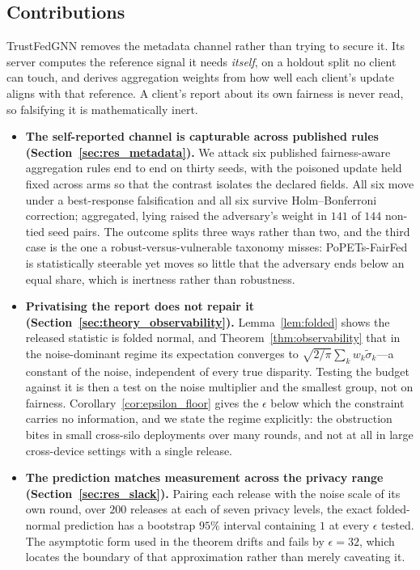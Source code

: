 \documentclass[preprint,12pt]{elsarticle}
\theoremstyle{plain}
\theoremstyle{definition}
\theoremstyle{remark}
\begin{document}
\subsection{Contributions}

TrustFedGNN removes the metadata channel rather than trying to secure it. Its server computes the reference signal it needs \emph{itself}, on a holdout split no client can touch, and derives aggregation weights from how well each client's update aligns with that reference. A client's report about its own fairness is never read, so falsifying it is mathematically inert.

\begin{itemize}
\item \textbf{The self-reported channel is capturable across published rules (Section~\ref{sec:res_metadata}).} We attack six published fairness-aware aggregation rules end to end on thirty seeds, with the poisoned update held fixed across arms so that the contrast isolates the declared fields. All six move under a best-response falsification and all six survive Holm--Bonferroni correction; aggregated, lying raised the adversary's weight in $141$ of $144$ non-tied seed pairs. The outcome splits three ways rather than two, and the third case is the one a robust-versus-vulnerable taxonomy misses: PoPETs-FairFed is statistically steerable yet moves so little that the adversary ends below an equal share, which is inertness rather than robustness.

\item \textbf{Privatising the report does not repair it (Section~\ref{sec:theory_observability}).} Lemma~\ref{lem:folded} shows the released statistic is folded normal, and Theorem~\ref{thm:observability} that in the noise-dominant regime its expectation converges to $\sqrt{2/\pi}\sum_k w_k\tilde\sigma_k$---a constant of the noise, independent of every true disparity. Testing the budget against it is then a test on the noise multiplier and the smallest group, not on fairness. Corollary~\ref{cor:epsilon_floor} gives the $\epsilon$ below which the constraint carries no information, and we state the regime explicitly: the obstruction bites in small cross-silo deployments over many rounds, and not at all in large cross-device settings with a single release.

\item \textbf{The prediction matches measurement across the privacy range (Section~\ref{sec:res_slack}).} Pairing each release with the noise scale of its own round, over $200$ releases at each of seven privacy levels, the exact folded-normal prediction has a bootstrap $95\%$ interval containing $1$ at every $\epsilon$ tested. The asymptotic form used in the theorem drifts and fails by $\epsilon = 32$, which locates the boundary of that approximation rather than merely caveating it.


\end{itemize}
\end{document}
